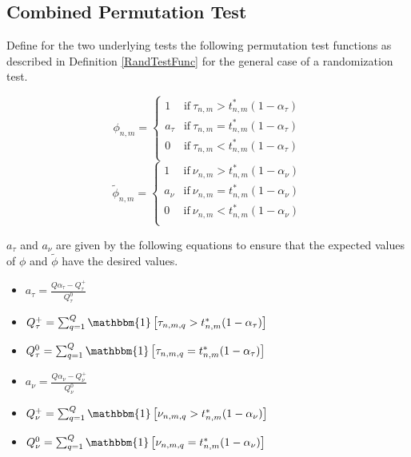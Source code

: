 \documentclass[12pt, a4paper]{article}
\theoremstyle{MAstyle} \newtheorem{assumption}{Assumption}[section]
\theoremstyle{MAstyle} \newtheorem{definition}{Definition}[section]
\begin{document}
		\subsection{Combined Permutation Test}
			Define for the two underlying tests the following permutation test functions as described in Definition \ref{RandTestFunc} for the general case of a randomization test.
			\begin{multicols}{2}
				\noindent
				\begin{equation*}
					\phi_{n,m} = \begin{cases}
						1 &\text{if} \ \tau_{n,m} > t^{*}_{n,m}(1-\alpha_{\tau}) \\
						a_{\tau} &\text{if} \ \tau_{n,m} = t^{*}_{n,m}(1-\alpha_{\tau}) \\
						0 &\text{if} \ \tau_{n,m} < t^{*}_{n,m}(1-\alpha_{\tau}) \\
					\end{cases}
				\end{equation*}
				\begin{equation}
					\tilde{\phi}_{n,m} = \begin{cases}
						1 &\text{if} \ \nu_{n,m} > t^{*}_{n,m}(1-\alpha_{\nu}) \\
						a_{\nu} &\text{if} \ \nu_{n,m} = t^{*}_{n,m}(1-\alpha_{\nu}) \\
						0 &\text{if} \ \nu_{n,m} < t^{*}_{n,m}(1-\alpha_{\nu}) \\
					\end{cases}
				\end{equation}
			\end{multicols}
			$a_\tau$ and $a_\nu$ are given by the following equations to ensure that the expected values of $\phi$ and $\tilde{\phi}$ have the desired values.
			\begin{multicols}{2}
				\begin{itemize}
					\item $a_{\tau} = \frac{Q\alpha_{\tau} - Q_{\tau}^{+}}{Q_{\tau}^{0}}$ 
					\item $Q_{\tau}^{+} = \sum_{q = 1}^{Q}\mathbbm{1}\left[\tau_{n,m,q} > t^{*}_{n,m}(1-\alpha_{\tau})\right]$
					\item $Q_{\tau}^{0} = \sum_{q = 1}^{Q}\mathbbm{1}\left[\tau_{n,m,q} = t^{*}_{n,m}(1-\alpha_{\tau})\right]$
					\item $a_{\nu} = \frac{Q\alpha_{\nu} - Q_{\nu}^{+}}{Q_{\nu}^{0}}$ 
					\item $Q_{\nu}^{+} = \sum_{q = 1}^{Q}\mathbbm{1}\left[\nu_{n,m,q} > t^{*}_{n,m}(1-\alpha_{\nu})\right]$
					\item $Q_{\nu}^{0} = \sum_{q = 1}^{Q}\mathbbm{1}\left[\nu_{n,m,q} = t^{*}_{n,m}(1-\alpha_{\nu})\right]$
				\end{itemize} 
			\end{multicols}
			
\end{document}
